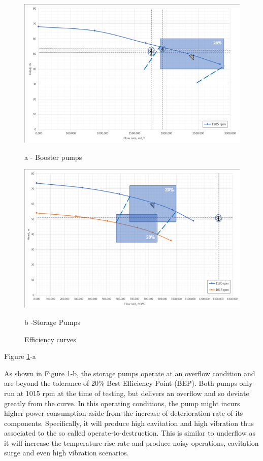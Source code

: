 \begin{figure}[!htb]
	\begin{minipage}[b]{0.5\linewidth}
		\centering
		\includegraphics[width=\textwidth]{figures/ch04_fig_efficiency01}
		\caption*{a - Booster pumps}%
	\end{minipage}
	\hspace{0.05cm}
	\begin{minipage}[b]{0.5\linewidth}
		\centering
		\includegraphics[width=\textwidth]{figures/ch04_fig_efficiency02}
		\caption*{b -Storage Pumps} %
	\end{minipage}
		\caption{Efficiency curves}
		\label{ch04_efficiencycurves}
\end{figure}

Figure \ref{ch04_efficiencycurves}-a 

As shown in Figure \ref{ch04_efficiencycurves}-b, the storage pumps operate at an overflow condition and are beyond the tolerance of 20\% Best Efficiency Point (BEP). Both pumps only run at 1015 rpm at the time of testing, but delivers an overflow and so deviate greatly from the curve. In this operating conditions, the pump might incurs higher power consumption aside from the increase of deterioration rate of its components. Specifically, it will produce high cavitation and high vibration thus associated to the so called operate-to-destruction. This is similar to underflow as it will increase the temperature rise rate and produce noisy operations, cavitation surge and even high vibration scenarios.  

